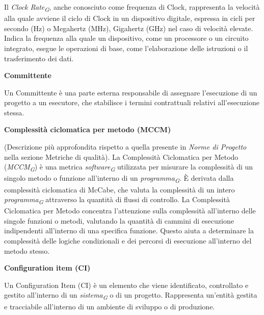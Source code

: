 \documentclass{article}
\begin{document}
Il \textit{Clock Rate}\textsubscript{\textit{G}}, anche conosciuto come frequenza di Clock, rappresenta la velocità alla quale avviene il ciclo di Clock in un dispositivo digitale, espressa in cicli per secondo (Hz) o Megahertz (MHz), Gigahertz (GHz) nel caso di velocità elevate. Indica la frequenza alla quale un dispositivo, come un processore o un circuito integrato, esegue le operazioni di base, come l'elaborazione delle istruzioni o il trasferimento dei dati. 

\vspace{0.4cm}

\textbf{Committente}

\vspace{0.1cm}

Un Committente è una parte esterna responsabile di assegnare l'esecuzione di un progetto a un esecutore, che stabilisce i termini contrattuali relativi all'esecuzione stessa.

\vspace{0.4cm}

\textbf{Complessità ciclomatica per metodo (MCCM)}

\vspace{0.1cm}

(Descrizione più approfondita rispetto a quella presente in \textit{Norme di Progetto} nella sezione Metriche di qualità). La Complessità Ciclomatica per Metodo (\textit{MCCM}\textsubscript{\textit{G}}) è una metrica \textit{software}\textsubscript{\textit{G}} utilizzata per misurare la complessità di un singolo metodo o funzione all'interno di un \textit{programma}\textsubscript{\textit{G}}. È derivata dalla complessità ciclomatica di McCabe, che valuta la complessità di un intero \textit{programma}\textsubscript{\textit{G}} attraverso la quantità di flussi di controllo.
La Complessità Ciclomatica per Metodo concentra l'attenzione sulla complessità all'interno delle singole funzioni o metodi, valutando la quantità di cammini di esecuzione indipendenti all'interno di una specifica funzione. Questo aiuta a determinare la complessità delle logiche condizionali e dei percorsi di esecuzione all'interno del metodo stesso.

\vspace{0.4cm}

\textbf{Configuration item (CI)}

\vspace{0.1cm}

Un Configuration Item (CI) è un elemento che viene identificato, controllato e gestito all'interno di un \textit{sistema}\textsubscript{\textit{G}} o di un progetto. Rappresenta un'entità gestita e tracciabile all'interno di un ambiente di sviluppo o di produzione.
\end{document}
